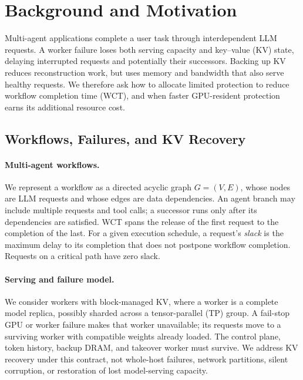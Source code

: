 \section{Background and Motivation}
\label{sec:background-motivation}

Multi-agent applications complete a user task through interdependent LLM
requests. A worker failure loses both serving capacity and key--value (KV)
state, delaying interrupted requests and potentially their successors.
Backing up KV reduces reconstruction work, but uses memory and bandwidth
that also serve healthy requests. We therefore ask how to allocate limited
protection to reduce workflow completion time (WCT), and when faster
GPU-resident protection earns its additional resource cost.



\subsection{Workflows, Failures, and KV Recovery}
\label{sec:motivation-background}

\paragraph{Multi-agent workflows.}
We represent a workflow as a directed acyclic graph $G=(V,E)$, whose nodes
are LLM requests and whose edges are data dependencies. An agent branch may
include multiple requests and tool calls; a successor runs only after its
dependencies are satisfied. WCT spans the release of the first request to
the completion of the last. For a given execution schedule, a request's
\emph{slack} is the maximum delay to its completion that does not postpone
workflow completion. Requests on a critical path have zero slack.

\paragraph{Serving and failure model.}
We consider workers with block-managed KV, where a worker is a complete
model replica, possibly sharded across a tensor-parallel (TP) group.
A fail-stop GPU or worker failure makes that worker unavailable; its
requests move to a surviving worker with compatible weights already
loaded. The control plane, token history, backup DRAM, and takeover worker
must survive. We address KV recovery under this contract, not whole-host
failures, network partitions, silent corruption, or restoration of lost
model-serving capacity.

